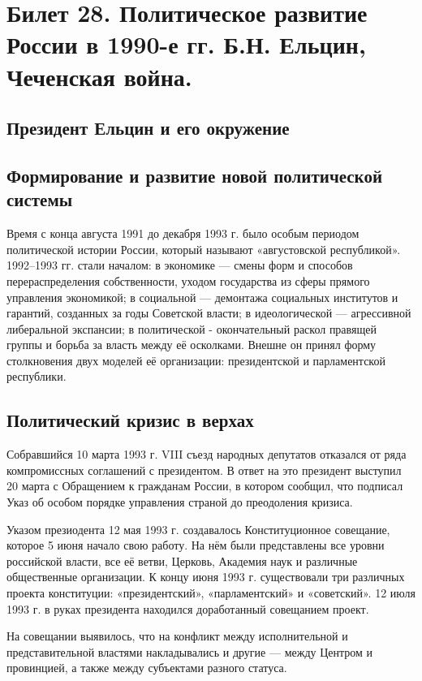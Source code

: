 \section{Билет 28. Политическое развитие России в 1990-е гг. Б.Н. Ельцин, Чеченская война.}

\subsection{Президент Ельцин и его окружение}
\subsection{Формирование и развитие новой политической системы}
Время с конца августа 1991 до декабря 1993 г. было особым периодом политической истории России, который называют «августовской республикой». 1992–1993 гг. стали началом: в экономике — смены форм и способов перераспределения собственности, уходом государства из сферы прямого управления экономикой; в социальной — демонтажа социальных институтов и гарантий, созданных за годы Советской власти; в идеологической — агрессивной либеральной экспансии; в политической - окончательный раскол правящей группы и борьба за власть между её осколками. Внешне он принял форму столкновения двух моделей её организации: президентской и парламентской республики.

\subsection{Политический кризис в верхах}
Собравшийся 10 марта 1993 г. VIII съезд народных депутатов отказался от ряда компромиссных соглашений с президентом. В ответ на это президент выступил 20 марта с Обращением к гражданам России, в котором сообщил, что подписал Указ об особом порядке управления страной до преодоления кризиса.

Указом презиодента 12 мая 1993 г. создавалось Конституционное совещание, которое 5 июня начало свою работу. На нём были представлены все уровни российской власти, все её ветви, Церковь, Академия наук и различные общественные организации. К концу июня 1993 г. существовали три различных проекта конституции: «президентский», «парламентский» и «советский». 12 июля 1993 г. в руках президента находился доработанный совещанием проект.

На совещании выявилось, что на конфликт между исполнительной и представительной властями накладывались и другие — между Центром и провинцией, а также между субъектами разного статуса.

